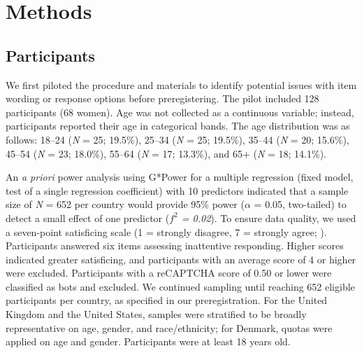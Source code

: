 \section{Methods}

\subsection{Participants}
We first piloted the procedure and materials to identify potential issues with item wording or response options before preregistering. The pilot included 128 participants (68 women). Age was not collected as a continuous variable; instead, participants reported their age in categorical bands. The age distribution was as follows: 18--24 (\textit{N} = 25; 19.5\%), 25--34 (\textit{N} = 25; 19.5\%), 35--44 (\textit{N} = 20; 15.6\%), 45--54 (\textit{N} = 23; 18.0\%), 55--64 (\textit{N} = 17; 13.3\%), and 65+ (\textit{N} = 18; 14.1\%).

An \textit{a priori} power analysis using G*Power for a multiple regression (fixed model, test of a single regression coefficient) with 10 predictors indicated that a sample size of \textit{N} = 652 per country would provide 95\% power ($\alpha$ = 0.05, two-tailed) to detect a small effect of one predictor (\textit{$f^2$ = 0.02}). To ensure data quality, we used a seven-point satisficing scale (1 = strongly disagree, 7 = strongly agree; \citealp{berry2022drivers}). Participants answered six items assessing inattentive responding. Higher scores indicated greater satisficing, and participants with an average score of 4 or higher were excluded. Participants with a reCAPTCHA score of 0.50 or lower were classified as bots and excluded. We continued sampling until reaching 652 eligible participants per country, as specified in our preregistration. For the United Kingdom and the United States, samples were stratified to be broadly representative on age, gender, and race/ethnicity; for Denmark, quotas were applied on age and gender. Participants were at least 18 years old.

